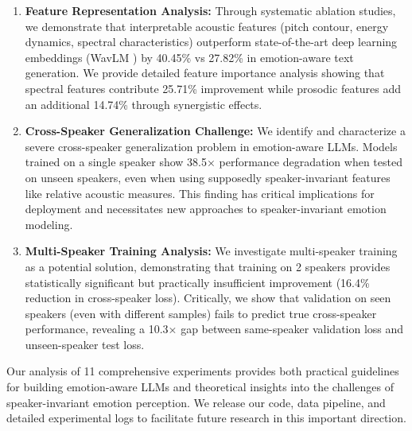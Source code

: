 \begin{enumerate}
    \item \textbf{Feature Representation Analysis:} Through systematic ablation studies, we demonstrate that interpretable acoustic features (pitch contour, energy dynamics, spectral characteristics) outperform state-of-the-art deep learning embeddings (WavLM \cite{chen2022wavlm}) by 40.45\% vs 27.82\% in emotion-aware text generation. We provide detailed feature importance analysis showing that spectral features contribute 25.71\% improvement while prosodic features add an additional 14.74\% through synergistic effects.

    \item \textbf{Cross-Speaker Generalization Challenge:} We identify and characterize a severe cross-speaker generalization problem in emotion-aware LLMs. Models trained on a single speaker show 38.5× performance degradation when tested on unseen speakers, even when using supposedly speaker-invariant features like relative acoustic measures. This finding has critical implications for deployment and necessitates new approaches to speaker-invariant emotion modeling.

    \item \textbf{Multi-Speaker Training Analysis:} We investigate multi-speaker training as a potential solution, demonstrating that training on 2 speakers provides statistically significant but practically insufficient improvement (16.4\% reduction in cross-speaker loss). Critically, we show that validation on seen speakers (even with different samples) fails to predict true cross-speaker performance, revealing a 10.3× gap between same-speaker validation loss and unseen-speaker test loss.
\end{enumerate}

Our analysis of 11 comprehensive experiments provides both practical guidelines for building emotion-aware LLMs and theoretical insights into the challenges of speaker-invariant emotion perception. We release our code, data pipeline, and detailed experimental logs to facilitate future research in this important direction.

